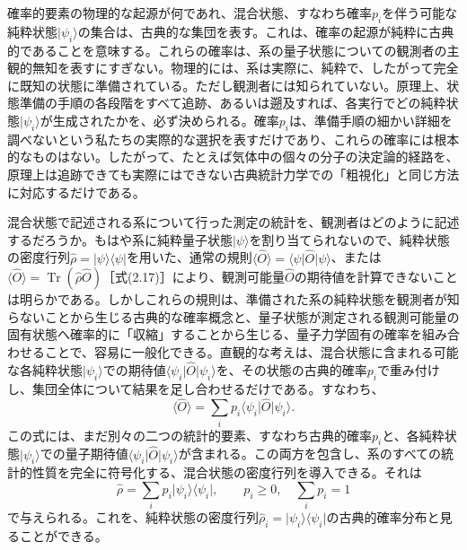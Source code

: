 確率的要素の物理的な起源が何であれ、混合状態、すなわち確率$p_i$を伴う可能な純粋状態$\lvert\psi_i\rangle$の集合は、古典的な集団を表す。これは、確率の起源が純粋に古典的であることを意味する。これらの確率は、系の量子状態についての観測者の主観的無知を表すにすぎない。物理的には、系は実際に、純粋で、したがって完全に既知の状態に準備されている。ただし観測者には知られていない。原理上、状態準備の手順の各段階をすべて追跡、あるいは遡及すれば、各実行でどの純粋状態$\lvert\psi_i\rangle$が生成されたかを、必ず決められる。確率$p_i$は、準備手順の細かい詳細を調べないという私たちの実際的な選択を表すだけであり、これらの確率には根本的なものはない。したがって、たとえば気体中の個々の分子の決定論的経路を、原理上は追跡できても実際にはできない古典統計力学での「粗視化」と同じ方法に対応するだけである。

\hypertarget{srcpage:38}{}\label{srcpage:38}
混合状態で記述される系について行った測定の統計を、観測者はどのように記述するだろうか。もはや系に純粋量子状態$\lvert\psi\rangle$を割り当てられないので、純粋状態の密度行列$\hat\rho=\lvert\psi\rangle\langle\psi\rvert$を用いた、通常の規則$\langle\hat O\rangle=\langle\psi\rvert\hat O\lvert\psi\rangle$、または$\langle\hat O\rangle=\operatorname{Tr}(\hat\rho\hat O)$［式(2.17)］により、観測可能量$\hat O$の期待値を計算できないことは明らかである。しかしこれらの規則は、準備された系の純粋状態を観測者が知らないことから生じる古典的な確率概念と、量子状態が測定される観測可能量の固有状態へ確率的に「収縮」することから生じる、量子力学固有の確率を組み合わせることで、容易に一般化できる。直観的な考えは、混合状態に含まれる可能な各純粋状態$\lvert\psi_i\rangle$での期待値$\langle\psi_i\rvert\hat O\lvert\psi_i\rangle$を、その状態の古典的確率$p_i$で重み付けし、集団全体について結果を足し合わせるだけである。すなわち、
\begin{equation}\langle\hat O\rangle=\sum_i p_i\langle\psi_i\rvert\hat O\lvert\psi_i\rangle.\tag{2.19}\end{equation}
この式には、まだ別々の二つの統計的要素、すなわち古典的確率$p_i$と、各純粋状態$\lvert\psi_i\rangle$での量子期待値$\langle\psi_i\rvert\hat O\lvert\psi_i\rangle$が含まれる。この両方を包含し、系のすべての統計的性質を完全に符号化する、混合状態の密度行列を導入できる。それは
\begin{equation}\hat\rho=\sum_i p_i\lvert\psi_i\rangle\langle\psi_i\rvert,\qquad p_i\ge0,\quad\sum_i p_i=1\tag{2.20}\end{equation}
で与えられる。これを、純粋状態の密度行列$\hat\rho_i=\lvert\psi_i\rangle\langle\psi_i\rvert$の古典的確率分布と見ることができる。

